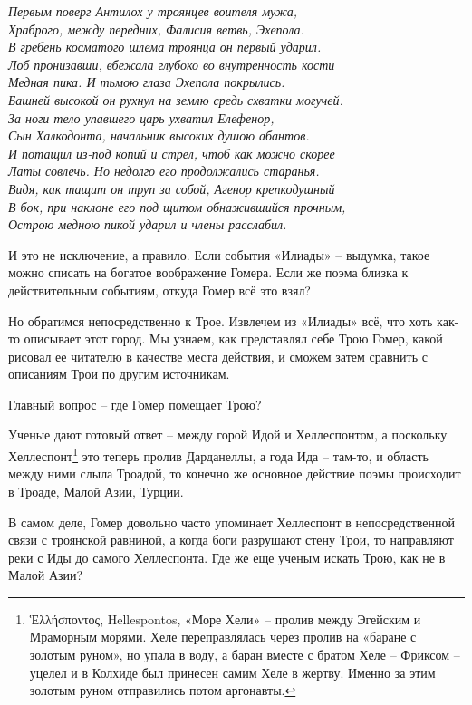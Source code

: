 \noindent
\textit{Первым поверг Антилох у троянцев воителя мужа,\\
Храброго, между передних, Фалисия ветвь, Эхепола.\\
В гребень косматого шлема троянца он первый ударил.\\
Лоб пронизавши, вбежала глубоко во внутренность кости\\
Медная пика. И тьмою глаза Эхепола покрылись.\\
Башней высокой он рухнул на землю средь схватки могучей.\\
За ноги тело упавшего царь ухватил Елефенор,\\
Сын Халкодонта, начальник высоких душою абантов.\\
И потащил из-под копий и стрел, чтоб как можно скорее\\
Латы совлечь. Но недолго его продолжались старанья.\\
Видя, как тащит он труп за собой, Агенор крепкодушный\\
В бок, при наклоне его под щитом обнажившийся прочным,\\
Острою медною пикой ударил и члены расслабил.\\}

И это не исключение, а правило. Если события «Илиады» – выдумка, такое можно списать на богатое воображение Гомера. Если же поэма близка к действительным событиям, откуда Гомер всё это взял?

Но обратимся непосредственно к Трое. Извлечем из «Илиады» всё, что хоть как-то описывает этот город. Мы узнаем, как представлял себе Трою Гомер, какой рисовал ее читателю в качестве места действия, и сможем затем сравнить с описаниям Трои по другим источникам.

Главный вопрос – где Гомер помещает Трою?

Ученые дают готовый ответ – между горой Идой и Хеллеспонтом, а поскольку Хеллеспонт\footnote{Ἑλλήσποντος, Hellespontos, «Море Хели» – пролив между Эгейским и Мраморным морями. Хеле переправлялась через пролив на «баране с золотым руном», но упала в воду, а баран вместе с братом Хеле –  Фриксом – уцелел и в Колхиде был принесен самим Хеле в жертву. Именно за этим золотым руном отправились потом аргонавты.} это теперь пролив Дарданеллы, а года Ида – там-то, и область между ними слыла Троадой, то конечно же основное действие поэмы происходит в Троаде, Малой Азии, Турции.

В самом деле, Гомер довольно часто упоминает Хеллеспонт в непосредственной связи с троянской равниной, а когда боги разрушают стену Трои, то направляют реки с Иды до самого Хеллеспонта. Где же еще ученым искать Трою, как не в Малой Азии?

